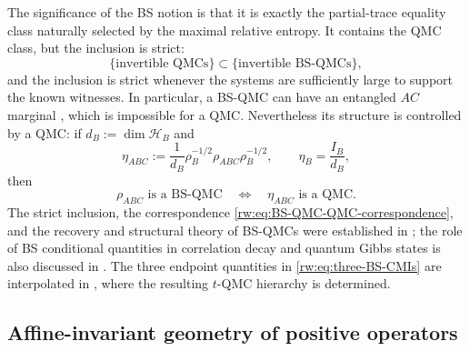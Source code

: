 \documentclass[11pt]{article}
\theoremstyle{remark}
\newcommand{\1}{\mathbbm{1}}
\begin{document}
The significance of the BS notion is that it is exactly the
partial-trace equality class naturally selected by the maximal
relative entropy.  It contains the QMC class, but the
inclusion is strict:
\begin{equation}
 \{\text{invertible QMCs}\}
 \subset
 \{\text{invertible BS-QMCs}\},
 \label{rw:eq:qmc-in-bsqmc}
\end{equation}
and the inclusion is strict whenever the systems are sufficiently
large to support the known witnesses.  In particular, a BS-QMC can
have an entangled $AC$ marginal
\cite[Proposition~4.3]{Bluhm:2025kai}, which is impossible for a
QMC.  Nevertheless its structure is controlled by a QMC: if
$d_B:=\dim\mathcal H_B$ and
\begin{equation}
 \eta_{ABC}
 :=\frac1{d_B}\rho_B^{-1/2}\rho_{ABC}\rho_B^{-1/2},
 \qquad
 \eta_B=\frac{I_B}{d_B},
 \label{rw:eq:canonical-BS-QMC-shadow}
\end{equation}
then
\begin{equation}
 \rho_{ABC}\text{ is a BS-QMC}
 \quad\Longleftrightarrow\quad
 \eta_{ABC}\text{ is a QMC}.
 \label{rw:eq:BS-QMC-QMC-correspondence}
\end{equation}
The strict inclusion, the correspondence
\eqref{rw:eq:BS-QMC-QMC-correspondence}, and the recovery and
structural theory of BS-QMCs were established in
\cite{Bluhm:2025kai}; the role of BS conditional quantities in
correlation decay and quantum Gibbs states is also discussed in
\cite{bluhm2023continuity,alhambra2026conditional}.  The three endpoint quantities in
\eqref{rw:eq:three-BS-CMIs} are interpolated in
, where the resulting
$t$-QMC hierarchy is determined.


\subsection{Affine-invariant geometry of positive operators}
\label{rw:subsec:positive-geometry}
\end{document}
